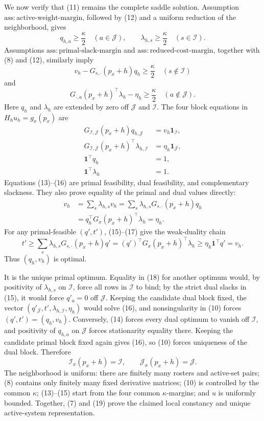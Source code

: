 We now verify that (11) remains the complete saddle solution.  Assumption
\(\mathrm{ass{:}active\mbox{-}weight\mbox{-}margin}\), followed by (12) and
a uniform reduction of the neighborhood, gives
\[
 q_{h,a}\geq\frac\kappa2\quad(a\in\mathcal J),
 \qquad
 \lambda_{h,s}\geq\frac\kappa2\quad(s\in\mathcal I).
 \tag{13}
\]
Assumptions \(\mathrm{ass{:}primal\mbox{-}slack\mbox{-}margin}\) and
\(\mathrm{ass{:}reduced\mbox{-}cost\mbox{-}margin}\), together with (8) and
(12), similarly imply
\[
 v_h-G_{s,\cdot}(p_x+h)q_h\geq\frac\kappa2
       \quad(s\notin\mathcal I)
 \tag{14}
\]
and
\[
 G_{\cdot,a}(p_x+h)^\top\lambda_h-\eta_h\geq\frac\kappa2
       \quad(a\notin\mathcal J).
 \tag{15}
\]
Here \(q_h\) and \(\lambda_h\) are extended by zero off \(\mathcal J\) and
\(\mathcal I\).  The four block equations in
\(H_hu_h=g_x(p_x)\) are
\[
 \begin{aligned}
 G_{\mathcal I,\mathcal J}(p_x+h)q_{h,\mathcal J}
     &=v_h\mathbf 1_{\mathcal I},\\
 G_{\mathcal I,\mathcal J}(p_x+h)^\top\lambda_{h,\mathcal I}
     &=\eta_h\mathbf 1_{\mathcal J},\\
 \mathbf 1^\top q_h&=1,\\
 \mathbf 1^\top\lambda_h&=1.
 \end{aligned}
 \tag{16}
\]
Equations (13)--(16) are primal feasibility, dual feasibility, and
complementary slackness.  They also prove equality of the primal and dual
values directly:
\[
 \begin{aligned}
 v_h
 &=\sum_s\lambda_{h,s}v_h
  =\sum_s\lambda_{h,s}G_{s,\cdot}(p_x+h)q_h\\
 &=q_h^\top G_x(p_x+h)^\top\lambda_h
  =\eta_h.
 \end{aligned}
 \tag{17}
\]
For any primal-feasible \((q',t')\), (15)--(17) give the weak-duality chain
\[
 t'\geq\sum_s\lambda_{h,s}G_{s,\cdot}(p_x+h)q'
 =(q')^\top G_x(p_x+h)^\top\lambda_h
 \geq\eta_h\mathbf 1^\top q'=v_h.
 \tag{18}
\]
Thus \((q_h,v_h)\) is optimal.

It is the unique primal optimum.  Equality in (18) for another optimum would,
by positivity of \(\lambda_{h,s}\) on \(\mathcal I\), force all rows in
\(\mathcal I\) to bind; by the strict dual slacks in (15), it would force
\(q'_a=0\) off \(\mathcal J\).  Keeping the candidate dual block fixed, the
vector \((q'_{\mathcal J},t',\lambda_{h,\mathcal I},\eta_h)\) would solve
(16), and nonsingularity in (10) forces \((q',t')=(q_h,v_h)\).  Conversely,
(14) forces every dual optimum to vanish off \(\mathcal I\), and positivity
of \(q_{h,a}\) on \(\mathcal J\) forces stationarity equality there.  Keeping
the candidate primal block fixed again gives (16), so (10) forces uniqueness
of the dual block.  Therefore
\[
 \mathcal I_x(p_x+h)=\mathcal I,
 \qquad
 \mathcal J_x(p_x+h)=\mathcal J.
 \tag{19}
\]
The neighborhood is uniform: there are finitely many rosters and active-set
pairs; (8) contains only finitely many fixed derivative matrices; (10) is
controlled by the common \(\kappa\); (13)--(15) start from the four common
\(\kappa\)-margins; and \(u\) is uniformly bounded.  Together, (7) and (19)
prove the claimed local constancy and unique active-system representation.

